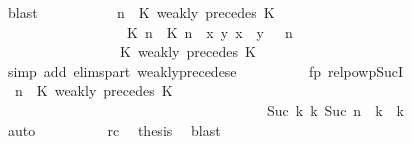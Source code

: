 \begin{isabellebody}
\ blast\isanewline
\ \ \ \ \ \ \ \ \isamarkupfalse%
\ {\isacartoucheopen}{\isacharparenleft}{\isasymGamma}{\isacharcomma}\ n\ {\isasymturnstile}\ {\isacharparenleft}{\isacharparenleft}K\ weakly\ precedes\ K\ {\isacharhash}\ {\isasymPsi}{\isacharparenright}\ {\isasymtriangleright}\ {\isasymPhi}{\isacharparenright}\isanewline
\ \ \ \ \ \ \ \ \ \ \ \ \ \ \ \ {\isasymhookrightarrow}\ {\isacharparenleft}{\isacharparenleft}{\isacharparenleft}{\isasymlceil}{\isacharhash}\isactrlsup {\isasymle}\ K\ n{\isacharcomma}\ {\isacharhash}\isactrlsup {\isasymle}\ K\ n{\isasymrceil}\ {\isasymin}\ {\isacharparenleft}{\isasymlambda}{\isacharparenleft}x{\isacharcomma}\ y{\isacharparenright}{\isachardot}\ x\ {\isasymle}\ y{\isacharparenright}{\isacharparenright}\ {\isacharhash}\ {\isasymGamma}{\isacharparenright}{\isacharcomma}\ n\isanewline
\ \ \ \ \ \ \ \ \ \ \ \ \ \ {\isasymturnstile}\ {\isasymPsi}\ {\isasymtriangleright}\ {\isacharparenleft}{\isacharparenleft}K\ weakly\ precedes\ K\ {\isacharhash}\ {\isasymPhi}{\isacharparenright}{\isacharparenright}{\isacartoucheclose}\ \isamarkupfalse%
\ {\isacharparenleft}simp\ add{\isacharcolon}\ elims{\isacharunderscore}part\ weakly{\isacharunderscore}precedes{\isacharunderscore}e{\isacharparenright}\isanewline
\ \ \ \ \ \ \ \ \isamarkupfalse%
\ fp\ relpowp{\isacharunderscore}Suc{\isacharunderscore}I{}\ \isamarkupfalse%
\ {\isacartoucheopen}{\isacharparenleft}{\isasymGamma}{\isacharcomma}\ n\ {\isasymturnstile}\ {\isacharparenleft}{\isacharparenleft}K\ weakly\ precedes\ K\ {\isacharhash}\ {\isasymPsi}{\isacharparenright}\ {\isasymtriangleright}\ {\isasymPhi}{\isacharparenright}\isanewline
\ \ \ \ \ \ \ \ \ \ \ \ \ \ \ \ \ \ \ \ \ \ \ \ \ \ \ \ \ \ \ \ \ \ \ \ \ \ {\isasymhookrightarrow}\isactrlbsup Suc\ k\isactrlesup \ {\isacharparenleft}{\isasymGamma}\isactrlsub k{\isacharcomma}\ Suc\ n\ {\isasymturnstile}\ {\isasymPsi}\isactrlsub k\ {\isasymtriangleright}\ {\isasymPhi}\isactrlsub k{\isacharparenright}{\isacartoucheclose}\isanewline
\ \ \ \ \ \ \ \ \ \ \isamarkupfalse%
\ auto\isanewline
\ \ \ \ \ \ \ \ \isamarkupfalse%
\ rc\ \isamarkupfalse%
\ {\isacharquery}thesis\ \isamarkupfalse%
\ blast\isanewline
\ \ \ \ \ \ \isamarkupfalse%

\end{isabellebody}
